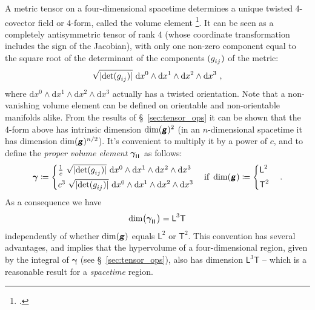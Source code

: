 \documentclass[\ifafour a4paper,12pt,\else a5paper,10pt,\fi%
onecolumn,oneside,article,%
british%
]{memoir}
\makeatletter
\theoremstyle{remark}
\theoremstyle{innote}
\newcommand*{\mathte}[1]{\textbf{\textit{\textsf{#1}}}}
\newcommand*{\citep}{\footcites}
\newcommand*{\delt}{\deltaup}%
\newcommand*{\di}{\mathrm{d}}%
\newcommand*{\defd}{\coloneqq}
\DeclarePairedDelimiter\abs{\lvert}{\rvert}
\renewcommand*{\|}[1][]{\nonscript\,#1\vert\nonscript\;\mathopen{}}
\newcommand*{\sect}{\S}%
\newcommand*{\q}{}%
\DeclareRobustCommand*{\q}{%
  \mathbin{\mathpalette\bigcdot@{}}%
}
\newcommand*{\bigcdot@scalefactor}{0.7}
\newcommand*{\bigcdot@widthfactor}{1.5}
\newcommand*{\bigcdot@}[2]{%
  \sbox0{$#1\vcenter{}$}%
  \sbox2{$#1\cdot\m@th$}%
  \hbox to \bigcdot@widthfactor\wd2{%
    \hfil
    \raise\ht0\hbox{%
      \scalebox{\bigcdot@scalefactor}{%
        \lower\ht0\hbox{$#1\bullet\m@th$}%
      }%
    }%
    \hfil
  }%
}
\newcommand*{\Le}{\textsf{L}}
\newcommand*{\Ti}{\textsf{T}}
\newcommand*{\Li}{\textsf{L}}
\newcommand*{\yg}{\mathte{g}}
\renewcommand*{\i}{\indices}
\newcommand*{\dix}[1][i]{\di x^{#1}}
\newcommand*{\ye}{\bm{e}}
\newcommand*{\ygv}{\bm{\gamma}}
\newcommand*{\rul}{{\mkern2mu\rule[-0.1ex]{0.75pt}{1.1ex}\mkern2mu}}
\DeclarePairedDelimiter\mul{\rul}{\rul}%
\makeatother
\begin{document}
A metric tensor on a four-dimensional spacetime determines a unique twisted
4-covector field or 4-form, called the volume element
\citep[\sect~V.24]{derham1955_t1984}[\sect~V.A.4]{choquetbruhatetal1977_r1996}[\sect~6.2]{abrahametal1983_r1988}.
It can be seen as a completely antisymmetric tensor of rank 4 (whose
coordinate transformation includes the sign of the Jacobian), with only one
non-zero component equal to the square root of the determinant of
the %
components $(g\i{_{ij}})$ of the metric:
\begin{equation*}
  \label{eq:undim_volume_elem}
  \sqrt{\smash[b]{\abs{\det(g\i{_{ij}})}}}\ \dix[0]\land\dix[1]\land\dix[2]\land\dix[3] \ ,
\end{equation*}
where
$\dix[0]\land\dix[1]\land\dix[2]\land\dix[3]$ %
actually has a twisted orientation. Note that a non-vanishing volume
element can be defined on orientable and non-orientable manifolds alike.
From the results of \sect~\ref{sec:tensor_ops} it can be shown that the
4-form above has intrinsic dimension $\dim(\yg)^{2}$ (in an $n$-dimensional
spacetime it has dimension $\dim(\yg)^{n/2}$). It's convenient to multiply
it by a power of $c$, and to define the \emph{proper volume element}
$\ygv\i{_{\mul{\q\q\q\q}}}$ as follows:
\begin{equation}
  \label{eq:volume_elem}
  \ygv \defd
      \begin{cases}
        \frac{1}{c}\
        \sqrt{\smash[b]{\abs{\det(g\i{_{ij}})}}}\ \dix[0]\land\dix[1]\land\dix[2]\land\dix[3] 
     \\[\jot]
        c^{3}\
        \sqrt{\smash[b]{\abs{\det(g\i{_{ij}})}}}\ \dix[0]\land\dix[1]\land\dix[2]\land\dix[3] 
  \end{cases}
  \text{if }\dim(\yg)\defd
  \begin{cases}
    \Le^2 \\[\jot]
     \Ti^2
  \end{cases}.
\end{equation}
As a consequence we have
\begin{equation}
  \label{eq:dim_volume_elem}
  \dim\bigl(\ygv\i{_{\mul{\q\q\q\q}}}\bigr) = \Le^{3}\Ti
\end{equation}
independently of whether $\dim(\yg)$ equals $\Li^{2}$ or $\Ti^{2}$. This
convention has several advantages, and implies that the hypervolume of a
four-dimensional region, given by the integral of $\ygv$ (see
\sect~\ref{sec:tensor_ops}), also has dimension $\Li^{3}\Ti$ -- which is a
reasonable result for a \emph{spacetime} region.
\end{document}
